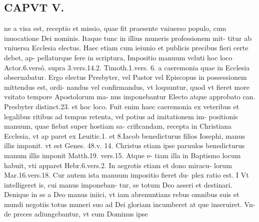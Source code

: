 \documentclass{article}
\begin{document}
\begin{pages}
\section*{CAPVT  V. }
\marginpar{[ p.359 ]}\pstart ne a visa est, receptio et missio, quae fit praesente vniuerso populo, cum inuocatione Dei nominis. Itaque tunc in illius muneris professionem mit- titur ab vniuersa Ecclesia electus. Haec etiam cum ieiunio et publicis precibus fieri certe debet, ap- pellaturque fere in scriptura, Impositio manuum veluti hoc loco Actor.6.versó. supra 3.vers.14.2. Timoth.1.vers. 6. a caeremonia quae in Ecclesia obseruabatur. Ergo electus Presbyter, vel Pastor vel Episcopus in possessionem mittendus est, ordi- nandus vel confirmandus, vt loquuntur, quod vt fieret more vsitato tempore Apostolorum ma- nus imponebantur Electo atque approbato can. Presbyter distinct.23. et hoc loco. Fuit enim haec caeremonia ex veteribus et legalibus ritibus ad tempus retenta, vel potius ad imitationem im- positionis manuum, quae fiebat super hostiam sa- crificandam, recepta in Christiana Ecclesia, vt ap paret ex Leuitic.1. et 8.Iacob benedicturus filios Iosephi, manus illis imponit. vt est Genes. 48.v. 14. Christus etiam ipse paruulos benedicturus manum illis imponit Matth.19. vers.15. Atque e- tiam illa in Baptismo locum habuit, vti apparet Hebr.6.vers.2. In aegrotis etiam et dono miracu- lorum Mar.16.vers.18.  \pend\pstart Cur autem ista manuum impositio fieret du- plex ratio est.  \pend\pstart I Vt intelligeret is, cui manus imponeban- tur, se totum Deo asseri et destinari. Denique in se a Deo manus iniici, vt iam abrenuntians rebus omnibus suis et mundi negotiis totus muneri suo ad Dei gloriam incumberet at que inseruiret. Vn- de preces adiungebantur, vt eum Dominus ipse  \pend

\end{pages}
\end{document}
